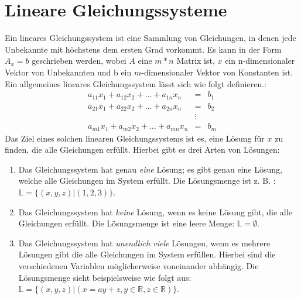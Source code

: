 \documentclass[a4paper, 12pt]{report}
\begin{document}
\section{Lineare Gleichungssysteme}
Ein lineares Gleichungssystem ist eine Sammlung von Gleichungen, in denen jede Unbekannte mit höchstens
dem ersten Grad vorkommt.
Es kann in der Form $ A_x = b $ geschrieben werden, wobei $A$ eine $ m*n $ Matrix ist,
$x$ ein n-dimensionaler Vektor von Unbekannten
und b ein $m$-dimensionaler Vektor von Konstanten ist.
Ein allgemeines lineares Gleichungssystem lässt sich wie folgt definieren.: \cite{1}
\begin{align}
\label{eq:linGle}
    a_{11}x_{1}+ a_{12}x_{2}+\hdots+ a_{1n}x_{n} &=& b_1 \nonumber \\
    a_{21}x_{1}+ a_{22}x_{2}+\hdots+ a_{2n}x_{n} &=& b_2 \nonumber\\
                                                 &\vdots&  \nonumber \\
    a_{m1}x_{1}+ a_{m2}x_2+\hdots+a_{mn}x_{n} &=& b_{m}
\end{align}
Das Ziel eines solchen linearen Gleichungssystems ist es, eine Lösung für $x$ zu finden, die alle Gleichungen erfüllt.
Hierbei gibt es drei Arten von Lösungen:
\begin{enumerate}
    \item Das Gleichungssystem hat genau \textit{eine} Lösung;
        es gibt genau eine Lösung, welche alle Gleichungen im System
        erfüllt. Die Lösungsmenge ist z. B. : $\mathbb{L} = \{ (x,y,z)| (1,2,3)\} $.
    \item Das Gleichungssystem hat \textit{keine} Lösung, wenn es keine Lösung gibt,
        die alle Gleichungen erfüllt. Die Lösungsmenge ist eine leere Menge: $ \mathbb{L}= \emptyset$.
    \item Das Gleichungssystem hat \textit{unendlich viele} Lösungen, wenn es mehrere Lösungen gibt
        die alle Gleichungen im System erfüllen.
        Hierbei sind die verschiedenen Variablen möglicherweise voneinander abhängig.
        Die Lösungsmenge sieht beispielsweise wie folgt aus:
        \newline $ \mathbb{L} = \{(x, y, z)| (x = ay + z, y\in \mathbb{R}, z \in \mathbb{R}) \} $.
\end{enumerate}
\end{document}

